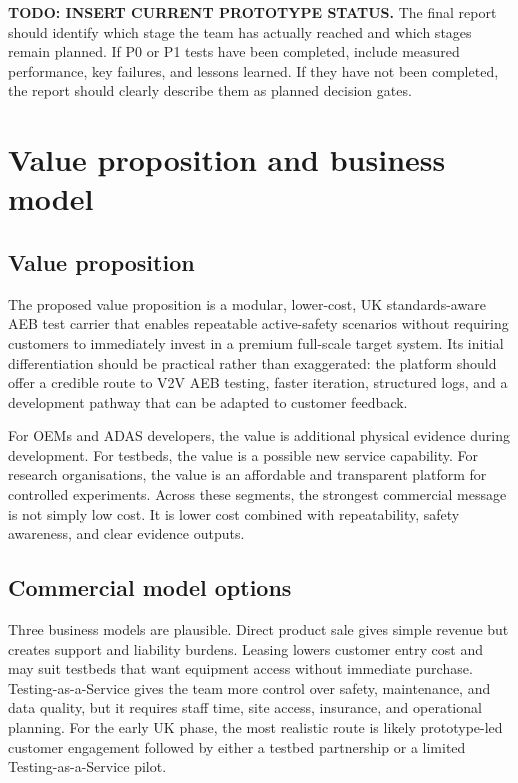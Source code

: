 \textbf{TODO: INSERT CURRENT PROTOTYPE STATUS.} The final report should identify which stage the team has actually reached and which stages remain planned. If P0 or P1 tests have been completed, include measured performance, key failures, and lessons learned. If they have not been completed, the report should clearly describe them as planned decision gates.

\section{Value proposition and business model}

\subsection{Value proposition}

The proposed value proposition is a modular, lower-cost, UK standards-aware AEB test carrier that enables repeatable active-safety scenarios without requiring customers to immediately invest in a premium full-scale target system. Its initial differentiation should be practical rather than exaggerated: the platform should offer a credible route to V2V AEB testing, faster iteration, structured logs, and a development pathway that can be adapted to customer feedback.

For OEMs and ADAS developers, the value is additional physical evidence during development. For testbeds, the value is a possible new service capability. For research organisations, the value is an affordable and transparent platform for controlled experiments. Across these segments, the strongest commercial message is not simply low cost. It is lower cost combined with repeatability, safety awareness, and clear evidence outputs.

\subsection{Commercial model options}

Three business models are plausible. Direct product sale gives simple revenue but creates support and liability burdens. Leasing lowers customer entry cost and may suit testbeds that want equipment access without immediate purchase. Testing-as-a-Service gives the team more control over safety, maintenance, and data quality, but it requires staff time, site access, insurance, and operational planning. For the early UK phase, the most realistic route is likely prototype-led customer engagement followed by either a testbed partnership or a limited Testing-as-a-Service pilot.

